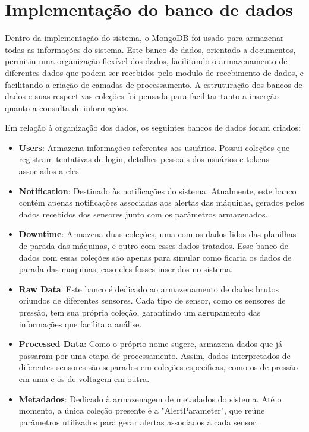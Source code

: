 \section[Implementação do banco de dados]{Implementação do banco de dados}


Dentro da implementação do sistema, o MongoDB foi usado para armazenar todas as informações do sistema. Este banco de dados, orientado a documentos, permitiu uma organização flexível dos dados, facilitando o armazenamento de diferentes dados que podem ser recebidos pelo modulo de recebimento de dados, e facilitando a criação de camadas de processamento. A estruturação dos bancos de dados e suas respectivas coleções foi pensada para facilitar tanto a inserção quanto a consulta de informações.

Em relação à organização dos dados, os seguintes bancos de dados foram criados:

\begin{itemize}
    \item \textbf{Users}: Armazena informações referentes aos usuários. Possui coleções que registram tentativas de login, detalhes pessoais dos usuários e tokens associados a eles.
    
    \item \textbf{Notification}: Destinado às notificações do sistema. Atualmente, este banco contém apenas notificações associadas aos alertas das máquinas, gerados pelos dados recebidos dos sensores junto com os parâmetros armazenados.
    
    \item \textbf{Downtime}: Armazena duas coleções, uma com os dados lidos das planilhas de parada das máquinas, e outro com esses dados tratados. Esse banco de dados com essas coleções são apenas para simular como ficaria os dados de parada das maquinas, caso eles fosses inseridos no sistema.
    
    \item \textbf{Raw Data}: Este banco é dedicado ao armazenamento de dados brutos oriundos de diferentes sensores. Cada tipo de sensor, como os sensores de pressão, tem sua própria coleção, garantindo um agrupamento das informações que facilita a análise.
    
    \item \textbf{Processed Data}: Como o próprio nome sugere, armazena dados que já passaram por uma etapa de processamento. Assim, dados interpretados de diferentes sensores são separados em coleções específicas, como os de pressão em uma e os de voltagem em outra.
    
    \item \textbf{Metadados}: Dedicado à armazenagem de metadados do sistema. Até o momento, a única coleção presente é a "AlertParameter", que reúne parâmetros utilizados para gerar alertas associados a cada sensor.
\end{itemize}


